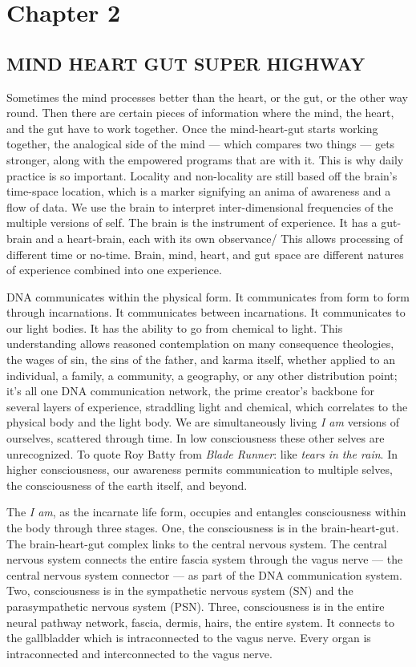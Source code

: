 \section*{Chapter 2}\label{chapter-2}

\subsection*{MIND HEART GUT SUPER
HIGHWAY}\label{mind-heart-gut-super-highway}

Sometimes the mind processes better than the heart, or the gut, or the
other way round. Then there are certain pieces of information where the
mind, the heart, and the gut have to work together. Once the
mind-heart-gut starts working together, the analogical side of the mind
--- which compares two things --- gets stronger, along with the
empowered programs that are with it. This is why daily practice is so
important. Locality and non-locality are still based off the brain's
time-space location, which is a marker signifying an anima of awareness
and a flow of data. We use the brain to interpret inter-dimensional
frequencies of the multiple versions of self. The brain is the
instrument of experience. It has a gut-brain and a heart-brain, each
with its own observance/ This allows processing of different time or
no-time. Brain, mind, heart, and gut space are different natures of
experience combined into one experience.

DNA communicates within the physical form. It communicates from form to
form through incarnations. It communicates between incarnations. It
communicates to our light bodies. It has the ability to go from chemical
to light. This understanding allows reasoned contemplation on many
consequence theologies, the wages of sin, the sins of the father, and
karma itself, whether applied to an individual, a family, a community, a
geography, or any other distribution point; it's all one DNA
communication network, the prime creator's backbone for several layers
of experience, straddling light and chemical, which correlates to the
physical body and the light body. We are simultaneously living \emph{I
am} versions of ourselves, scattered through time. In low consciousness
these other selves are unrecognized. To quote Roy Batty from \emph{Blade
Runner}: like \emph{tears in the rain}. In higher consciousness, our
awareness permits communication to multiple selves, the consciousness of
the earth itself, and beyond.

The \emph{I am}, as the incarnate life form, occupies and entangles
consciousness within the body through three stages. One, the
consciousness is in the brain-heart-gut. The brain-heart-gut complex
links to the central nervous system. The central nervous system connects
the entire fascia system through the vagus nerve --- the central nervous
system connector --- as part of the DNA communication system. Two,
consciousness is in the sympathetic nervous system (SN) and the
parasympathetic nervous system (PSN). Three, consciousness is in the
entire neural pathway network, fascia, dermis, hairs, the entire system.
It connects to the gallbladder which is intraconnected to the vagus
nerve. Every organ is intraconnected and interconnected to the vagus
nerve.

